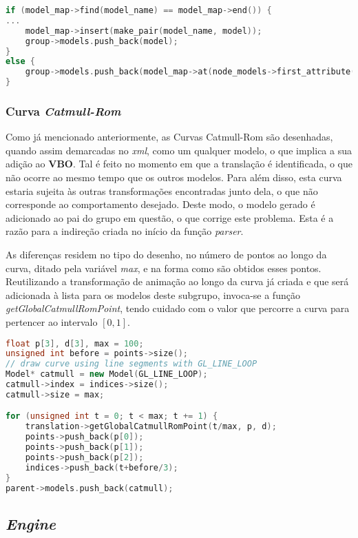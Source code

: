 \documentclass[14pt, a4 paper]{report}
\begin{document}
\begin{lstlisting}[language = c++]
if (model_map->find(model_name) == model_map->end()) {
...
    model_map->insert(make_pair(model_name, model));
    group->models.push_back(model);
}
else {
    group->models.push_back(model_map->at(node_models->first_attribute()->value()));
}
\end{lstlisting}

\subsubsection{Curva \textit{Catmull-Rom}}

Como já mencionado anteriormente, as Curvas Catmull-Rom são desenhadas, quando assim demarcadas no \textit{xml}, como um qualquer modelo, o que implica a sua adição ao \textbf{VBO}. Tal é feito no momento em que a translação é identificada, o que não ocorre ao mesmo tempo que os outros modelos. Para além disso, esta curva estaria sujeita às outras transformações encontradas junto dela, o que não corresponde ao comportamento desejado. Deste modo, o modelo gerado é adicionado ao pai do grupo em questão, o que corrige este problema. Esta é a razão para a indireção criada no início da função \textit{parser}.

As diferenças residem no tipo do desenho, no número de pontos ao longo da curva, ditado pela variável \textit{max}, e na forma como são obtidos esses pontos. Reutilizando a transformação de animação ao longo da curva já criada e que será adicionada à lista para os modelos deste subgrupo, invoca-se a função \textit{getGlobalCatmullRomPoint}, tendo cuidado com o valor que percorre a curva para pertencer ao intervalo $[0,1]$.

\begin{lstlisting}[language = c++]
float p[3], d[3], max = 100;
unsigned int before = points->size();
// draw curve using line segments with GL_LINE_LOOP
Model* catmull = new Model(GL_LINE_LOOP);
catmull->index = indices->size();
catmull->size = max;

for (unsigned int t = 0; t < max; t += 1) {
    translation->getGlobalCatmullRomPoint(t/max, p, d);
    points->push_back(p[0]);
    points->push_back(p[1]);
    points->push_back(p[2]);
    indices->push_back(t+before/3);
}
parent->models.push_back(catmull);
\end{lstlisting}

\subsection{\textit{Engine}}
\end{document}
